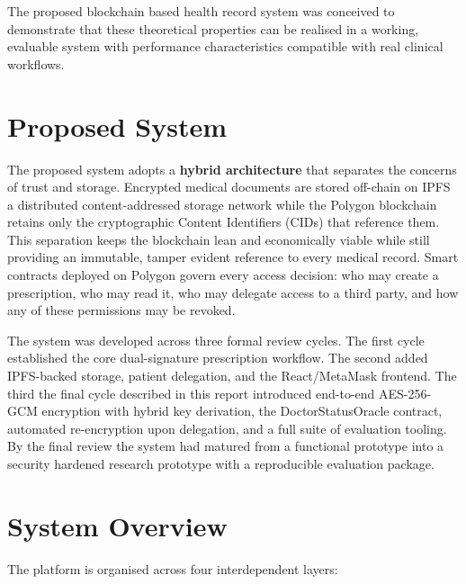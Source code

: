 \documentclass[12pt,a4wide]{report}
\begin{document}
The proposed blockchain based health record system was conceived to demonstrate that these theoretical properties can be
realised in a working, evaluable system with performance characteristics compatible
with real clinical workflows.

\section{Proposed System}

The proposed system adopts a \textbf{hybrid architecture} that separates the concerns of
trust and storage. Encrypted medical documents are stored off-chain on IPFS
a distributed content-addressed storage network while the Polygon blockchain
retains only the cryptographic Content Identifiers (CIDs) that reference them.
This separation keeps the blockchain lean and economically viable while still
providing an immutable, tamper evident reference to every medical record. Smart
contracts deployed on Polygon govern every access decision: who may create a
prescription, who may read it, who may delegate access to a third party, and how
any of these permissions may be revoked.

The system was developed across three formal review cycles. The first cycle
established the core dual-signature prescription workflow. The second added
IPFS-backed storage, patient delegation, and the React/MetaMask frontend. The
third the final cycle described in this report introduced end-to-end
AES-256-GCM encryption with hybrid key derivation, the DoctorStatusOracle
contract, automated re-encryption upon delegation, and a full suite of evaluation
tooling. By the final review the system had matured from a functional prototype
into a security hardened research prototype with a reproducible evaluation package.

\section{System Overview}

The platform is organised across four interdependent layers:
\end{document}
